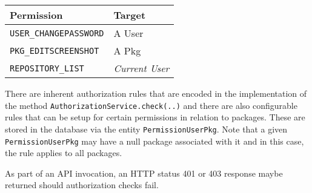 \begin{tabular}{ | l | l | }
\hline
Permission & Target \\
\hline
{\tt USER\_CHANGEPASSWORD} & A User \\
{\tt PKG\_EDITSCREENSHOT} & A Pkg \\
{\tt REPOSITORY\_LIST} & {\it Current User} \\
\hline
\end{tabular}

There are inherent authorization rules that are encoded in the implementation of the method {\tt AuthorizationService.check(..)} and there are also configurable rules that can be setup for certain permissions in relation to packages.  These are stored in the database via the entity {\tt PermissionUserPkg}.  Note that a given {\tt PermissionUserPkg} may have a null package associated with it and in this case, the rule applies to all packages.

As part of an API invocation, an HTTP status 401 or 403 response maybe returned should authorization checks fail.
